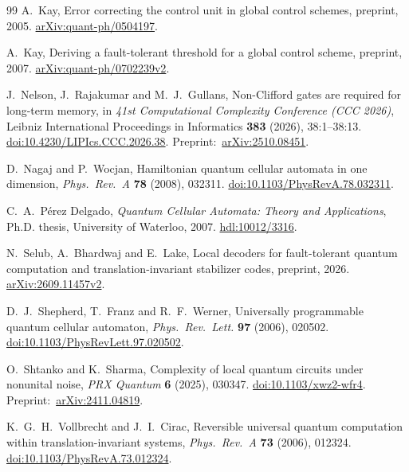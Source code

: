 \begin{thebibliography}{99}
A.~Kay,
Error correcting the control unit in global control schemes,
preprint, 2005.
\href{https://arxiv.org/abs/quant-ph/0504197}{arXiv:quant-ph/0504197}.

A.~Kay,
Deriving a fault-tolerant threshold for a global control scheme,
preprint, 2007.
\href{https://arxiv.org/abs/quant-ph/0702239v2}{arXiv:quant-ph/0702239v2}.

J.~Nelson, J.~Rajakumar and M.~J.~Gullans,
Non-Clifford gates are required for long-term memory,
in \emph{41st Computational Complexity Conference (CCC 2026)},
Leibniz International Proceedings in Informatics
\textbf{383} (2026), 38:1--38:13.
\href{https://doi.org/10.4230/LIPIcs.CCC.2026.38}{doi:10.4230/LIPIcs.CCC.2026.38}.
Preprint:~\href{https://arxiv.org/abs/2510.08451}{arXiv:2510.08451}.

D.~Nagaj and P.~Wocjan,
Hamiltonian quantum cellular automata in one dimension,
\emph{Phys.~Rev.~A} \textbf{78} (2008), 032311.
\href{https://doi.org/10.1103/PhysRevA.78.032311}{doi:10.1103/PhysRevA.78.032311}.

C.~A.~P\'erez Delgado,
\emph{Quantum Cellular Automata: Theory and Applications},
Ph.D. thesis, University of Waterloo, 2007.
\href{https://hdl.handle.net/10012/3316}{hdl:10012/3316}.

N.~Selub, A.~Bhardwaj and E.~Lake,
Local decoders for fault-tolerant quantum computation and translation-invariant stabilizer codes,
preprint, 2026.
\href{https://arxiv.org/abs/2609.11457v2}{arXiv:2609.11457v2}.

D.~J.~Shepherd, T.~Franz and R.~F.~Werner,
Universally programmable quantum cellular automaton,
\emph{Phys.~Rev.~Lett.} \textbf{97} (2006), 020502.
\href{https://doi.org/10.1103/PhysRevLett.97.020502}{doi:10.1103/PhysRevLett.97.020502}.

O.~Shtanko and K.~Sharma,
Complexity of local quantum circuits under nonunital noise,
\emph{PRX Quantum} \textbf{6} (2025), 030347.
\href{https://doi.org/10.1103/xwz2-wfr4}{doi:10.1103/xwz2-wfr4}.
Preprint:~\href{https://arxiv.org/abs/2411.04819}{arXiv:2411.04819}.

K.~G.~H.~Vollbrecht and J.~I.~Cirac,
Reversible universal quantum computation within translation-invariant systems,
\emph{Phys.~Rev.~A} \textbf{73} (2006), 012324.
\href{https://doi.org/10.1103/PhysRevA.73.012324}{doi:10.1103/PhysRevA.73.012324}.


\end{thebibliography}
